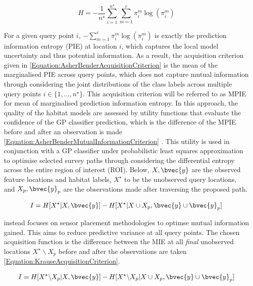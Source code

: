 		\begin{equation}
			H = - \frac{1}{n^{\star}} \sum_{i = 1}^{n^{\star}} \sum_{m = 1}^{c} \pi^{m}_{i} \log(\pi^{m}_{i})
		\label{Equation:AsherBenderAcquisitionCriterion}
		\end{equation}
		
		For a given query point $i$, $- \sum_{m = 1}^{c} \pi^{m}_{i} \log(\pi^{m}_{i})$ is exactly the prediction information entropy (PIE) at location $i$, which captures the local model uncertainty and thus potential information. As a result, the acquisition criterion given in \eqref{Equation:AsherBenderAcquisitionCriterion} is the mean of the marginalised PIE across query points, which does not capture mutual information through considering the joint distributions of the class labels across multiple query points $i \in \{1, \dots, n^{\star}\}$. This acquisition criterion will be referred to as MPIE for mean of marginalised prediction information entropy. In this approach, the quality of the habitat models are assessed by utility functions that evaluate the confidence of the GP classifier prediction, which is the difference of the MPIE before and after an observation is made \eqref{Equation:AsherBenderMutualInformationCriterion} \citep{Rigby:ROB20372}. This utility is used in conjunction with a GP classifier under probabilistic least squares approximation to optimise selected survey paths through considering the differential entropy across the entire region of interest (ROI). Below, $X, \bvec{y}$ are the observed feature locations and habitat labels, $X^{\star}$ to be the unobserved query locations, and $X_{p}, \bvec{y}_{p}$ are the observations made after traversing the proposed path.
	
		\begin{equation}
			I = H[X^{\star} | X, \bvec{y}] - H[X^{\star} | X \cup X_{p}, \bvec{y} \cup \bvec{y}_{p}]
		\label{Equation:AsherBenderMutualInformationCriterion}
		\end{equation}
		
		\cite{Krause:2008:NSP:1390681.1390689} instead focuses on sensor placement methodologies to optimse mutual information gained. This aims to reduce predictive variance at all query points. The chosen acquisition function is the difference between the MIE at all \textit{final} unobserved locations $X^{\star} \backslash X_{p}$ before and after the observations are taken \eqref{Equation:KrauseAcquisitionCriterion}.
		
		\begin{equation}
			I = H[X^{\star} \backslash X_{p} | X, \bvec{y}] - H[X^{\star} \backslash X_{p} | X \cup X_{p}, \bvec{y} \cup \bvec{y}_{p}]
		\label{Equation:KrauseAcquisitionCriterion}
		\end{equation}
		
